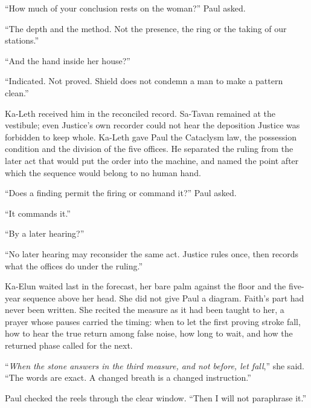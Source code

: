 ``How much of your conclusion rests on the woman?'' Paul asked.\par

``The depth and the method. Not the presence, the ring or the taking of our stations.''\par

``And the hand inside her house?''\par

``Indicated. Not proved. Shield does not condemn a man to make a pattern clean.''\par

Ka-Leth received him in the reconciled record. Sa-Tavan remained at the vestibule; even Justice's own recorder could not hear the deposition Justice was forbidden to keep whole. Ka-Leth gave Paul the Cataclysm law, the possession condition and the division of the five offices. He separated the ruling from the later act that would put the order into the machine, and named the point after which the sequence would belong to no human hand.\par

``Does a finding permit the firing or command it?'' Paul asked.\par

``It commands it.''\par

``By a later hearing?''\par

``No later hearing may reconsider the same act. Justice rules once, then records what the offices do under the ruling.''\par

Ka-Elun waited last in the forecast, her bare palm against the floor and the five-year sequence above her head. She did not give Paul a diagram. Faith's part had never been written. She recited the measure as it had been taught to her, a prayer whose pauses carried the timing: when to let the first proving stroke fall, how to hear the true return among false noise, how long to wait, and how the returned phase called for the next.\par

``\emph{When the stone answers in the third measure, and not before, let fall},'' she said. ``The words are exact. A changed breath is a changed instruction.''\par

Paul checked the reels through the clear window. ``Then I will not paraphrase it.''\par


